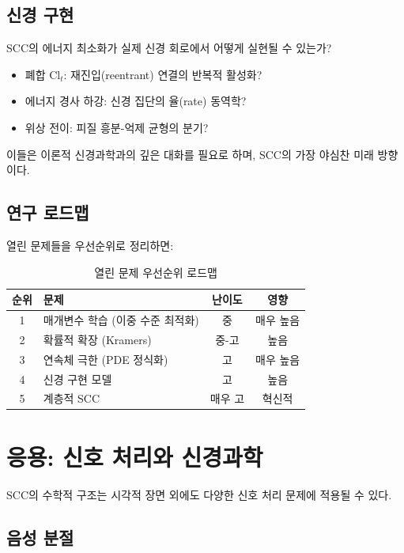 \subsection{신경 구현}

SCC의 에너지 최소화가 실제 신경 회로에서 어떻게 실현될 수 있는가?
\begin{itemize}
    \item 폐합 $\mathrm{Cl}_t$: 재진입(reentrant) 연결의 반복적 활성화?
    \item 에너지 경사 하강: 신경 집단의 율(rate) 동역학?
    \item 위상 전이: 피질 흥분-억제 균형의 분기?
\end{itemize}

이들은 이론적 신경과학과의 깊은 대화를 필요로 하며, SCC의 가장 야심찬 미래 방향이다.

\subsection{연구 로드맵}

열린 문제들을 우선순위로 정리하면:

\begin{table}[h]
\centering
\caption{열린 문제 우선순위 로드맵}
\label{tab:roadmap}
\small
\begin{tabular}{clcc}
\toprule
\textbf{순위} & \textbf{문제} & \textbf{난이도} & \textbf{영향} \\
\midrule
1 & 매개변수 학습 (이중 수준 최적화) & 중 & 매우 높음 \\
2 & 확률적 확장 (Kramers) & 중-고 & 높음 \\
3 & 연속체 극한 (PDE 정식화) & 고 & 매우 높음 \\
4 & 신경 구현 모델 & 고 & 높음 \\
5 & 계층적 SCC & 매우 고 & 혁신적 \\
\bottomrule
\end{tabular}
\end{table}


\section{응용: 신호 처리와 신경과학}
\label{sec:signal-neuro-applications}

SCC의 수학적 구조는 시각적 장면 외에도 다양한 신호 처리 문제에 적용될 수 있다.

\subsection{음성 분절}

